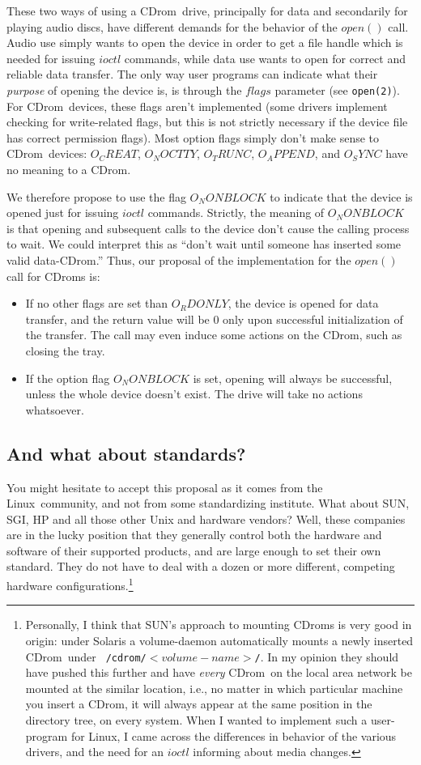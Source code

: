 \documentclass{article}
\def\linux{{\sc Linux}}
\def\cdrom{{\sc CDrom}}
\begin{document}
These two ways of using a \cdrom\ drive, principally for data and
secondarily for playing audio discs, have different demands for the
behavior of the $open()$ call. Audio use simply wants to open the
device in order to get a file handle which is needed for issuing
$ioctl$ commands, while data use wants to open for correct and
reliable data transfer. The only way user programs can indicate what
their {\em purpose\/} of opening the device is, is through the $flags$
parameter (see {\tt open(2)}). For \cdrom\ devices, these flags aren't
implemented (some drivers implement checking for write-related flags,
but this is not strictly necessary if the device file has correct
permission flags). Most option flags simply don't make sense to
\cdrom\ devices: $O_CREAT$, $O_NOCTTY$, $O_TRUNC$, $O_APPEND$, and
$O_SYNC$ have no meaning to a \cdrom. 

We therefore propose to use the flag $O_NONBLOCK$ to indicate
that the device is opened just for issuing $ioctl$
commands. Strictly, the meaning of $O_NONBLOCK$ is that opening and
subsequent calls to the device don't cause the calling process to
wait. We could interpret this as ``don't wait until someone has
inserted some valid data-\cdrom.'' Thus, our proposal of the
implementation for the $open()$ call for \cdrom s is:
\begin{itemize}
\item If no other flags are set than $O_RDONLY$, the device is opened
for data transfer, and the return value will be 0 only upon successful
initialization of the transfer. The call may even induce some actions
on the \cdrom, such as closing the tray.  
\item If the option flag $O_NONBLOCK$ is set, opening will always be
successful, unless the whole device doesn't exist. The drive will take
no actions whatsoever. 
\end{itemize}

\subsection{And what about standards?}

You might hesitate to accept this proposal as it comes from the
\linux\ community, and not from some standardizing institute. What
about SUN, SGI, HP and all those other Unix and hardware vendors?
Well, these companies are in the lucky position that they generally
control both the hardware and software of their supported products,
and are large enough to set their own standard. They do not have to
deal with a dozen or more different, competing hardware
configurations.\footnote{Personally, I think that SUN's approach to
mounting \cdrom s is very good in origin: under Solaris a
volume-daemon automatically mounts a newly inserted \cdrom\ under {\tt
/cdrom/$<volume-name>$/}. In my opinion they should have pushed this
further and have {\em every\/} \cdrom\ on the local area network be
mounted at the similar location, i.e., no matter in which particular
machine you insert a \cdrom, it will always appear at the same
position in the directory tree, on every system. When I wanted to
implement such a user-program for \linux, I came across the
differences in behavior of the various drivers, and the need for an
$ioctl$ informing about media changes.}
\end{document}
